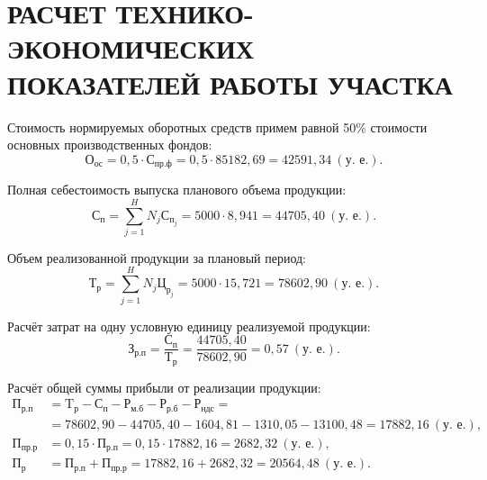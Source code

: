 \section[%
Расчет технико-экономических показателей работы участка
]{%
РАСЧЕТ ТЕХНИКО-ЭКОНОМИЧЕСКИХ \\
ПОКАЗАТЕЛЕЙ РАБОТЫ УЧАСТКА
}
\label{sec:tep}

Стоимость нормируемых оборотных средств примем равной 50\% стоимости
основных производственных фондов:
\begin{equation*}
  \text{О}_{\text{ос}} = 0{,}5 \cdot \text{С}_{\text{пр.ф}} =
  0{,}5 \cdot 85182{,}69 =
  42591{,}34 \: (\text{у.~е.}).
\end{equation*}

Полная себестоимость выпуска планового объема продукции:
\begin{equation*}
  \text{С}_{\text{п}} = \sum^{H}_{j=1} N_j \text{С}_{\text{п}_j} =
  5000 \cdot 8{,}941 =
  44705{,}40 \: (\text{у.~е.}).
\end{equation*}

Объем реализованной продукции за плановый период:
\begin{equation*}
  \text{Т}_{\text{р}} = \sum^{H}_{j=1} N_j \text{Ц}_{\text{р}_j} =
  5000 \cdot 15{,}721 =
  78602{,}90 \: (\text{у.~е.}).
\end{equation*}

Расчёт затрат на одну условную единицу реализуемой продукции:
\begin{equation*}
  \text{З}_{\text{р.п}} = \dfrac{\text{С}_{\text{п}}}{\text{Т}_{\text{р}}} =
  \dfrac{44705{,}40}{78602{,}90} =
  0{,}57 \: (\text{у.~е.}).
\end{equation*}

Расчёт общей суммы прибыли от реализации продукции:
\begin{align*}
  \text{П}_{\text{р.п}} &= 
  \text{T}_{\text{р}} - \text{С}_{\text{п}} - \text{Р}_{\text{м.б}} - 
  \text{Р}_{\text{р.б}} - \text{Р}_{\text{ндс}} = \\
  &= 78602{,}90 - 44705{,}40 - 1604{,}81 - 1310{,}05 - 13100{,}48 = 
  17882{,}16 \: (\text{у.~е.}), \\
  \text{П}_{\text{пр.р}} &= 0{,}15 \cdot \text{П}_{\text{р.п}} =
  0{,}15 \cdot 17882{,}16 = 
  2682{,}32 \: (\text{у.~е.}), \\
  \text{П}_{\text{р}} &= \text{П}_{\text{р.п}} + \text{П}_{\text{пр.р}} =
  17882{,}16 + 2682{,}32 = 
  20564{,}48 \: (\text{у.~е.}).
\end{align*}

